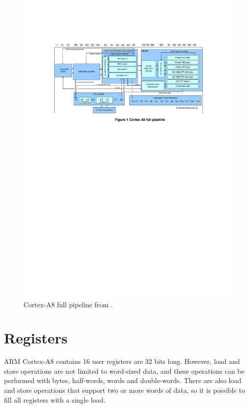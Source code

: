 \documentclass[oneside,a4paper]{report}
\begin{document}
\begin{figure}[htbp]
	\centering
	\includegraphics[width=1.0\textwidth]{./fig/Pipeline.pdf}
	\caption{Cortex-A8 full pipeline from \cite[p. 3]{Williamson}.}
	\label{fig:pipeline}
\end{figure}

\chapter{Registers}

ARM Cortex-A8 contains 16 user registers are 32 bits long. However, load and store operations are not limited to word-sized data, and these operations can be performed with bytes, half-words, words and double-words. There are also load and store operations that support two or more words of data, so it is possible to fill all registers with a single load.
\end{document}
